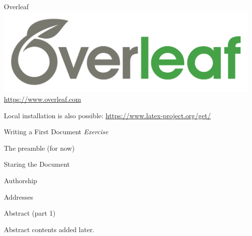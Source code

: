 \documentclass[final,aspectratio=43]{beamer}
\begin{document}
\begin{frame}{Overleaf}
    \centering
    \includegraphics[width=0.7\linewidth]{figures/overleaf}
    \url{https://www.overleaf.com}
    
    Local installation is also possible: 
    \url{https://www.latex-project.org/get/}
\end{frame}

\begin{frame}{Writing a First Document}
    \centering
    \emph{\Large Exercise}
    
    
\end{frame}

\begin{frame}[fragile]{The preamble (for now)}
    
    
    
\end{frame}

\begin{frame}[fragile]{Staring the Document}
    
\end{frame}

\begin{frame}[fragile]{Authorship}
    
\end{frame}

\begin{frame}[fragile]{Addresses}
    
\end{frame}

\begin{frame}[fragile]{Abstract (part 1)}
    
    
    Abstract contents added later.
    
    
\end{frame}
\end{document}
